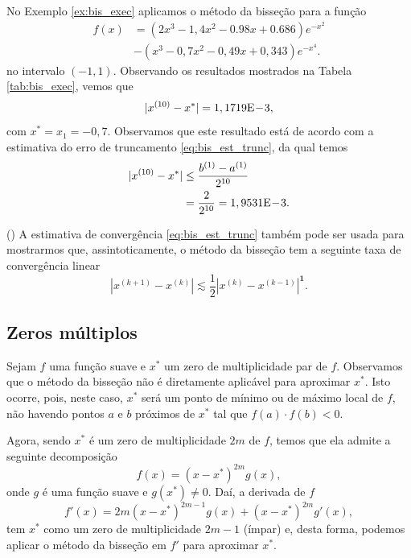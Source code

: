 \begin{ex}\label{ex:bis_conv}
  No Exemplo \ref{ex:bis_exec} aplicamos o método da bisseção para a função
  \begin{align}
  f(x) &= (2x^3-1,4x^2-0.98x+0.686)e^{-x^2} \nonumber\\
       &- (x^3-0,7x^2-0,49x+0,343)e^{-x^4}.
  \end{align}
no intervalo $(-1, 1)$. Observando os resultados mostrados na Tabela \ref{tab:bis_exec}, vemos que
\begin{equation}
  |x^{(10)}-x^*| = 1,1719\mathrm{E}\!-\!3,
\end{equation}
com $x^* = x_1 = -0,7$. Observamos que este resultado está de acordo com a estimativa do erro de truncamento \eqref{eq:bis_est_trunc}, da qual temos
\begin{align}
  |x^{(10)} - x^*| &\leq \frac{b^{(1)}-a^{(1)}}{2^{10}}\\
  &= \frac{2}{2^{10}} = 1,9531\mathrm{E}\!-\!3.
\end{align}
\end{ex}

\begin{obs}()
  A estimativa de convergência \eqref{eq:bis_est_trunc} também pode ser usada para mostrarmos que, assintoticamente, o método da bisseção tem a seguinte taxa de convergência linear
  \begin{equation}
    \left|x^{(k+1)} - x^{(k)}\right| \lesssim \frac{1}{2}\left|x^{(k)} - x^{(k-1)}\right|^{\pmb{1}}.
  \end{equation}
\end{obs}

\subsection{Zeros múltiplos}

Sejam $f$ uma função suave e $x^*$ um zero de multiplicidade par de $f$. Observamos que o método da bisseção não é diretamente aplicável para aproximar $x^*$. Isto ocorre, pois, neste caso, $x^*$ será um ponto de mínimo ou de máximo local de $f$, não havendo pontos $a$ e $b$ próximos de $x^*$ tal que $f(a)\cdot f(b) < 0$.

Agora, sendo $x^*$ é um zero de multiplicidade $2m$ de $f$, temos que ela admite a seguinte decomposição
\begin{equation}
  f(x) = (x-x^*)^{2m}g(x),
\end{equation}
onde $g$ é uma função suave e $g(x^*)\neq 0$. Daí, a derivada de $f$
\begin{equation}
  f'(x) = 2m(x-x^*)^{2m-1}g(x) + (x-x^*)^{2m}g'(x),
\end{equation}
tem $x^*$ como um zero de multiplicidade $2m-1$ (ímpar) e, desta forma, podemos aplicar o método da bisseção em $f'$ para aproximar $x^*$.

